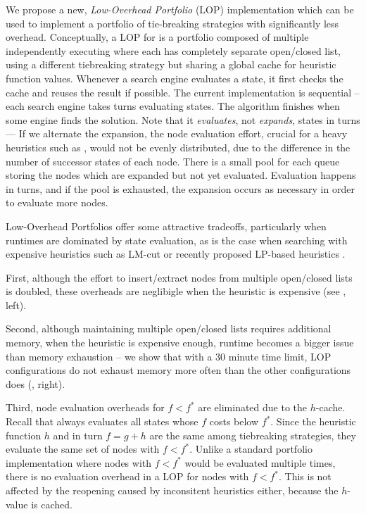 We propose a new, \emph{Low-Overhead Portfolio} (LOP) implementation which can be used to implement a portfolio of tie-breaking strategies with significantly less overhead.
% 
Conceptually, a LOP for \astar is a portfolio composed of multiple
independently executing \astar where each \astar has completely separate
open/closed list, using a different tiebreaking strategy but sharing a
global cache for heuristic function values. Whenever a search engine
evaluates a state, it first checks the cache and reuses the result if
possible.  The current implementation is sequential -- each search
engine takes turns evaluating states. The algorithm finishes when some
engine finds the solution. Note that it \emph{evaluates}, not
\emph{expands}, states in turns --- If we alternate the expansion, 
the node evaluation effort, crucial for
a heavy heuristics such as \lmcut, would not be evenly
distributed, due to the difference in the number of
successor states of each node. There is a small pool for each queue
storing the nodes which are expanded
but not yet evaluated. Evaluation happens in turns, and if the pool is
exhausted, the expansion occurs as necessary in order to evaluate
more nodes.

Low-Overhead Portfolios offer some attractive tradeoffs,
particularly when runtimes are dominated by state evaluation, as is the case when searching with 
expensive heuristics such as LM-cut or recently proposed LP-based heuristics \cite{PommereningRHB14,ImaiF14}.

First, although the effort to insert/extract nodes from multiple
open/closed lists is doubled, these overheads are neglibigle when the
heuristic is expensive (see , left).

Second, although maintaining multiple open/closed lists requires additional memory,
when the heuristic is expensive enough, runtime becomes a bigger issue
than memory exhaustion  -- we show that with a 30 minute time limit, LOP
configurations do not exhaust memory more often than the other
configurations does (, right).

Third, node evaluation overheads for $f < f^*$ are eliminated due to the $h$-cache.
Recall that \astar always evaluates all states whose $f$ costs 
below $f^*$. Since the heuristic function $h$ and in turn $f=g+h$ are
the same among tiebreaking strategies, they evaluate the same set of
nodes with $f<f^*$. Unlike a standard portfolio implementation where 
nodes with $f<f^*$ would be evaluated multiple times, there is no evaluation overhead in a LOP
for nodes with $f<f^*$.
This is not
affected by the reopening caused by inconsitent heuristics either,
because the $h$-value is cached.

